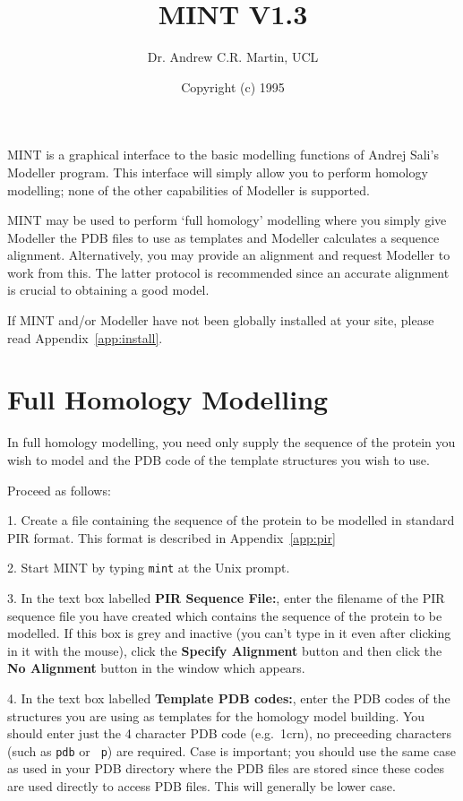 \documentclass[12pt]{article}
\title{MINT V1.3}
\author{Dr. Andrew C.R. Martin, UCL}
\date{Copyright (c) 1995}
\begin{document}
\maketitle

MINT is a graphical interface to the basic modelling functions of
Andrej Sali's Modeller program. This interface will simply allow you
to perform homology modelling; none of the other capabilities of
Modeller is supported. 

MINT may be used to perform `full homology' modelling where you simply
give Modeller the PDB files to use as templates and Modeller
calculates a sequence alignment. Alternatively, you may provide an
alignment and request Modeller to work from this. The latter protocol
is recommended since an accurate alignment is crucial to obtaining a
good model.

If MINT and/or Modeller have not been globally installed at your
site, please read Appendix~\ref{app:install}.


\section{Full Homology Modelling}
In full homology modelling, you need only supply the sequence of the
protein you wish to model and the PDB code of the template structures
you wish to use.
\vspace{1em}

\noindent Proceed as follows:

1. Create a file containing the sequence of the protein to be modelled
in standard PIR format. This format is described in
Appendix~\ref{app:pir}

2. Start MINT by typing {\tt mint} at the Unix prompt.

3. In the text box labelled {\bfseries PIR Sequence File:}, enter the
filename of the PIR sequence file you have created which contains the
sequence of the protein to be modelled. If this box is grey and
inactive (you can't type in it even after clicking in it with the
mouse), click the {\bfseries Specify Alignment} button and then click
the {\bfseries No Alignment} button in the window which appears.

4. In the text box labelled {\bfseries Template PDB codes:}, enter the
PDB codes of the structures you are using as templates for the
homology model building. You should enter just the 4 character PDB
code (e.g.\ 1crn), no preceeding characters (such as {\tt pdb} or {\tt
p}) are required. Case is important; you should use the same case as
used in your PDB directory where the PDB files are stored since these
codes are used directly to access PDB files. This will generally be
lower case.
\end{document}
